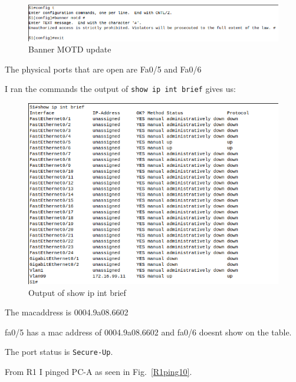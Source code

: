 \documentclass[../EngineeringJournal_CDavis.tex]{subfiles}
\begin{document}
\noindent{}



\begin{figure}[!hbt]\centering
\includegraphics[width=.75\linewidth]{Figures/2020-02-26-035114_701x102_scrot.png}\par
\caption{Banner MOTD update}
\label{Banner10}
\end{figure}

The physical ports that are open are Fa0/5 and Fa0/6


I ran the commands the output of 
{\scriptsize{\verb$show ip int brief$}\normalsize} gives us:


\begin{figure}[!hbt]\centering
\includegraphics[width=.69\linewidth]{Figures/2020-02-26-040122_601x435_scrot.png}\par
\caption{Output of show ip int brief }
\label{Intbrief10}
\end{figure}

\clearpage

\noindent{}


The macaddress is 0004.9a08.6602


fa0/5 has a mac address of 0004.9a08.6602 and fa0/6 doesnt show on the table.


The port status is {\scriptsize{\verb$Secure-Up$}\normalsize}.


From R1 I pinged PC-A as seen in Fig.~\ref{R1ping10}.
\end{document}
